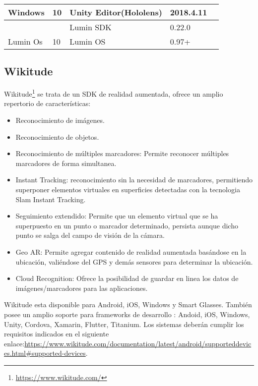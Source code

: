 \begin{table}[]
\begin{tabular}{|l|l|l|l|l|l|}
		\multirow{-3}{*}{Windows}  & \multirow{-3}{*}{10}     & \cellcolor[HTML]{EFEFEF}Unity Editor(Hololens) & \cellcolor[HTML]{EFEFEF}2018.4.11          & \multicolumn{2}{l|}{\multirow{-3}{*}{}}             \\ \hline
		&                          & Lumin SDK                                      & 0.22.0                                     & \multicolumn{2}{l|}{}                               \\ \cline{3-4}
		\multirow{-2}{*}{Lumin Os} & \multirow{-2}{*}{10}     & \cellcolor[HTML]{EFEFEF}Lumin OS               & \cellcolor[HTML]{EFEFEF}0.97+              & \multicolumn{2}{l|}{\multirow{-2}{*}{}}             \\ \hline
	\end{tabular}
\end{table}


\subsection{Wikitude}
Wikitude\footnote{\url{https://www.wikitude.com/}} se trata de un SDK de realidad aumentada, ofrece un amplio repertorio de características\cite{wikitude}: 
\begin{itemize}
	\item Reconocimiento de imágenes.
	\item Reconocimiento de objetos.
	\item Reconocimiento de múltiples marcadores: Permite reconocer múltiples marcadores de forma simultanea.
	\item Instant Tracking: reconocimiento sin la necesidad de marcadores, permitiendo superponer elementos virtuales en superficies detectadas con la tecnologia Slam Instant Tracking.
	
	\item Seguimiento extendido: Permite que un elemento virtual que se ha superpuesto en un punto o marcador determinado, persista aunque dicho punto se salga del campo de visión de la cámara.
	
	\item Geo AR: Permite agregar contenido de realidad aumentada basándose en la ubicación, valiéndose del GPS y demás sensores para determinar la ubicación.
	\item Cloud Recognition: Ofrece la posibilidad de guardar en linea los datos de imágenes/marcadores para las aplicaciones.
\end{itemize}

Wikitude esta disponible para Android, iOS, Windows y Smart Glasses.
También posee un amplio soporte para frameworks de desarrollo : Andoid, iOS, Windows, Unity, Cordova, Xamarin, Flutter, Titanium. 
Los sistemas deberán cumplir los requisitos indicados en el siguiente enlace:\url{https://www.wikitude.com/documentation/latest/android/supporteddevices.html#supported-devices}.

